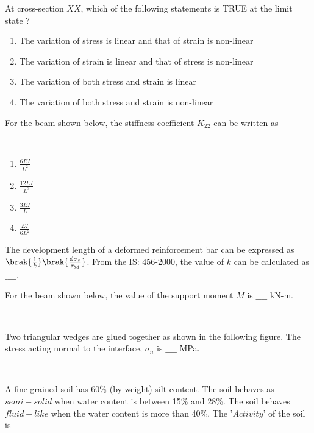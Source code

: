 At cross-section $XX$, which of the following statements is TRUE at the limit state ?
\begin{enumerate}
    \item The variation of stress is linear and that of strain is non-linear
    \item The variation of strain is linear and that of stress is non-linear
    \item The variation of both stress and strain is linear
    \item The variation of both stress and strain is non-linear \\
\end{enumerate}
\item For the beam shown below, the stiffness coefficient $K_{22}$ can be written as
\begin{figure}[!ht]
\centering
\resizebox{0.5\textwidth}{!}{%

}%
\end{figure} \\
\begin{enumerate}
    \item $\frac{6EI}{L^2}$
    \item $\frac{12EI}{L^3}$
    \item $\frac{3EI}{L}$
    \item $\frac{EI}{6L^2}$ \\
\end{enumerate}
\item The development length of a deformed reinforcement bar can be expressed as $\brak{\frac{1}{k}}\brak{\frac{\phi\sigma_s}{\tau_{bd}}}$. From the IS: 456-2000, the value of $k$ can be calculated as $\_\_\_\_$. \\
\item For the beam shown below, the value of the support moment $M$ is $\_\_\_\_$ kN-m.
\begin{figure}[!ht]
\centering
\resizebox{0.5\textwidth}{!}{%

}%
\end{figure} \\
\item Two triangular wedges are glued together as shown in the following figure. The stress acting normal to the interface, $\sigma_n$ is $\_\_\_\_$ MPa.
\begin{figure}[!ht]
\centering
\resizebox{0.5\textwidth}{!}{%

}%
\end{figure} \\
\item A fine-grained soil has 60\% (by weight) silt content. The soil behaves as $semi-solid$ when water content is between 15\% and 28\%. The soil behaves $fluid-like$ when the water content is more than 40\%. The '$Activity$' of the soil is
